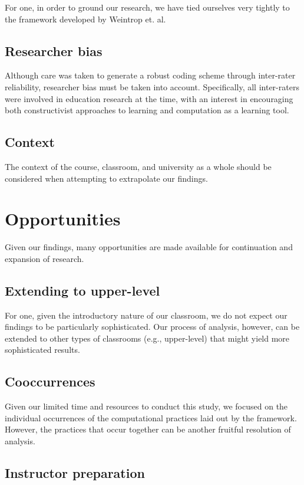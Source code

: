 \documentclass{msuphddissertation}
\begin{document}
\begin{doublespace}
For one, in order to ground our research, we have tied ourselves very tightly to the framework developed by Weintrop et. al.

\subsection{Researcher bias}

Although care was taken to generate a robust coding scheme through inter-rater reliability, researcher bias must be taken into account.  Specifically, all inter-raters were involved in education research at the time, with an interest in encouraging both constructivist approaches to learning and computation as a learning tool.

\subsection{Context}

The context of the course, classroom, and university as a whole should be considered when attempting to extrapolate our findings.

\section{Opportunities}

Given our findings, many opportunities are made available for continuation and expansion of research.

\subsection{Extending to upper-level}

For one, given the introductory nature of our classroom, we do not expect our findings to be particularly sophisticated.  Our process of analysis, however, can be extended to other types of classrooms (e.g., upper-level) that might yield more sophisticated results.

\subsection{Cooccurrences}

Given our limited time and resources to conduct this study, we focused on the individual occurrences of the computational practices laid out by the framework.  However, the practices that occur together can be another fruitful resolution of analysis.

\subsection{Instructor preparation}


\end{doublespace}
\end{document}
